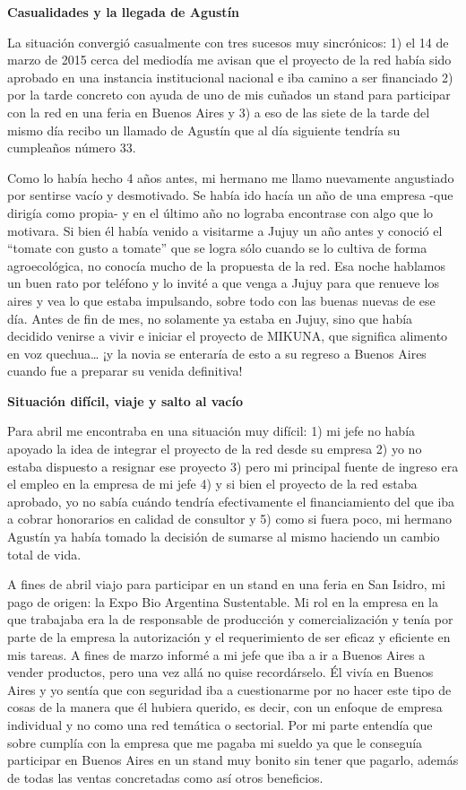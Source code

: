 \textbf{Casualidades y la llegada de Agustín}

La situación convergió casualmente con tres sucesos muy sincrónicos: 1)
el 14 de marzo de 2015 cerca del mediodía me avisan que el proyecto de
la red había sido aprobado en una instancia institucional nacional e iba
camino a ser financiado 2) por la tarde concreto con ayuda de uno de mis
cuñados un stand para participar con la red en una feria en Buenos Aires
y 3) a eso de las siete de la tarde del mismo día recibo un llamado de
Agustín que al día siguiente tendría su cumpleaños número 33.

Como lo había hecho 4 años antes, mi hermano me llamo nuevamente
angustiado por sentirse vacío y desmotivado. Se había ido hacía un año
de una empresa -que dirigía como propia- y en el último año no lograba
encontrase con algo que lo motivara. Si bien él había venido a visitarme
a Jujuy un año antes y conoció el ``tomate con gusto a tomate'' que se
logra sólo cuando se lo cultiva de forma agroecológica, no conocía mucho
de la propuesta de la red. Esa noche hablamos un buen rato por teléfono
y lo invité a que venga a Jujuy para que renueve los aires y vea lo que
estaba impulsando, sobre todo con las buenas nuevas de ese día. Antes de
fin de mes, no solamente ya estaba en Jujuy, sino que había decidido
venirse a vivir e iniciar el proyecto de MIKUNA, que significa alimento
en voz quechua\ldots{} ¡y la novia se enteraría de esto a su regreso a
Buenos Aires cuando fue a preparar su venida definitiva!

\textbf{Situación difícil, viaje y salto al vacío}

Para abril me encontraba en una situación muy difícil: 1) mi jefe no
había apoyado la idea de integrar el proyecto de la red desde su empresa
2) yo no estaba dispuesto a resignar ese proyecto 3) pero mi principal
fuente de ingreso era el empleo en la empresa de mi jefe 4) y si bien el
proyecto de la red estaba aprobado, yo no sabía cuándo tendría
efectivamente el financiamiento del que iba a cobrar honorarios en
calidad de consultor y 5) como si fuera poco, mi hermano Agustín ya
había tomado la decisión de sumarse al mismo haciendo un cambio total de
vida.

A fines de abril viajo para participar en un stand en una feria en San
Isidro, mi pago de origen: la Expo Bio Argentina Sustentable. Mi rol en
la empresa en la que trabajaba era la de responsable de producción y
comercialización y tenía por parte de la empresa la autorización y el
requerimiento de ser eficaz y eficiente en mis tareas. A fines de marzo
informé a mi jefe que iba a ir a Buenos Aires a vender productos, pero
una vez allá no quise recordárselo. Él vivía en Buenos Aires y yo sentía
que con seguridad iba a cuestionarme por no hacer este tipo de cosas de
la manera que él hubiera querido, es decir, con un enfoque de empresa
individual y no como una red temática o sectorial. Por mi parte entendía
que sobre cumplía con la empresa que me pagaba mi sueldo ya que le
conseguía participar en Buenos Aires en un stand muy bonito sin tener
que pagarlo, además de todas las ventas concretadas como así otros
beneficios.

